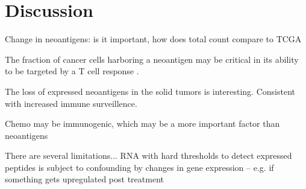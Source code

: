 \section*{Discussion}

Change in neoantigens: is it important, how does total count compare to TCGA

The fraction of cancer cells harboring a neoantigen may be critical in its ability to be targeted by a T cell response \cite{McGranahan_2016}.

The loss of expressed neoantigens in the solid tumors is interesting. Consistent with increased immune surveillence.

Chemo may be immunogenic, which may be a more important factor than neoantigens


There are several limitations... RNA with hard thresholds to detect expressed peptides is subject to confounding by changes in gene expression -- e.g. if something gets upregulated post treatment
